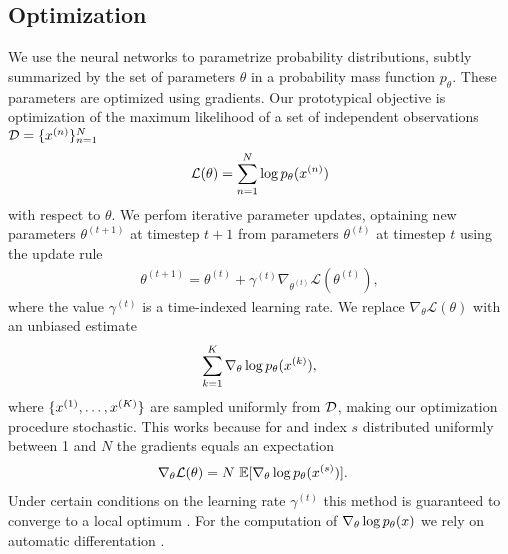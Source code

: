   \subsection{Optimization}
    We use the neural networks to parametrize probability distributions, subtly summarized by the set of parameters $\theta$ in a probability mass function $p_{\theta}$. These parameters are optimized using gradients. Our prototypical objective is optimization of the maximum likelihood of a set of independent observations $\mathcal{D} = \{ x^{(n)} \}_{n=1}^N$
    \begin{align*}
      \operatorname{\mathcal{L}}(\theta) = \sum_{n=1}^N \log p_{\theta}(x^{(n)})
    \end{align*}
    with respect to $\theta$. We perfom iterative parameter updates, optaining new parameters $\theta^{(t+1)}$ at timestep $t+1$ from parameters $\theta^{(t)}$ at timestep $t$ using the update rule
    \begin{align*}
      \theta^{(t+1)} = \theta^{(t)} + \gamma^{(t)} \nabla_{\theta^{(t)}} \mathcal{L}( \theta^{(t)} ),
    \end{align*}
    where the value $\gamma^{(t)}$ is a time-indexed learning rate. We replace $\nabla_{\theta} \mathcal{L}(\theta)$ with an unbiased estimate
    \begin{align*}
      \sum_{k=1}^{K} \nabla_{\theta} \log p_{\theta} (x^{(k)}),
    \end{align*}
    where $\{ x^{(1)}, \dots, x^{(K)}\}$ are sampled uniformly from $\mathcal{D}$, making our optimization procedure stochastic. This works because for and index $s$ distributed uniformly between 1 and $N$ the gradients equals an expectation
    \begin{align*}
      \nabla_{\theta} \mathcal{L}(\theta)
        &=  N \, \operatorname{\mathbb{E}} [ \nabla_{\theta} \log p_{\theta} (x^{(s)}) ].
    \end{align*}
    Under certain conditions on the learning rate $\gamma^{(t)}$ this method is guaranteed to converge to a local optimum \citep{robbins1951stochastic}. For the computation of $\nabla_{\theta} \log p_{\theta} (x)$ we rely on automatic differentation \citep{kucukelbir2017automatic}.
